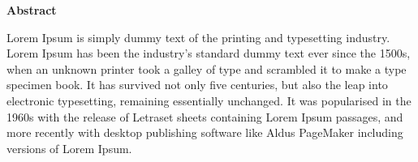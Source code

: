 \thispagestyle{plain} %

{\huge\textbf{Abstract}}
\vspace{1cm}

Lorem Ipsum is simply dummy text of the printing and typesetting industry. Lorem Ipsum has been the industry's standard dummy text ever since the 1500s, when an unknown printer took a galley of type and scrambled it to make a type specimen book. It has survived not only five centuries, but also the leap into electronic typesetting, remaining essentially unchanged. It was popularised in the 1960s with the release of Letraset sheets containing Lorem Ipsum passages, and more recently with desktop publishing software like Aldus PageMaker including versions of Lorem Ipsum.

